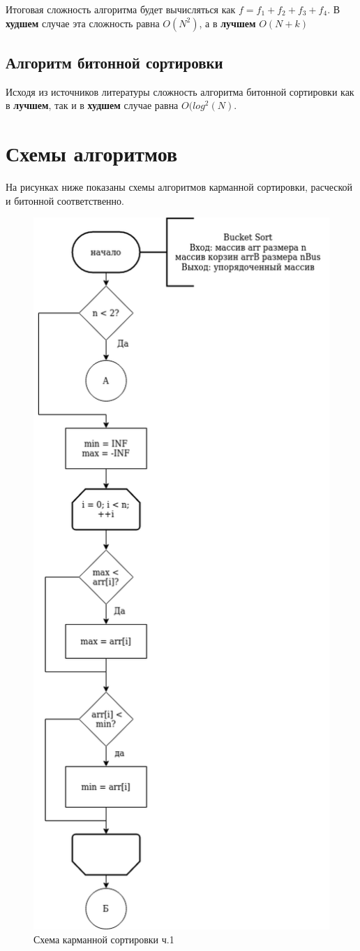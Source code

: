\documentclass[12pt]{report}
\begin{document}
	Итоговая сложность алгоритма будет вычисляться как $f = f_{1} + f_{2} + f_{3} + f_{4}$. В \textbf{худшем} случае эта сложность равна $O(N^2)$, а в \textbf{лучшем} $O(N + k)$
	
	\subsection{Алгоритм битонной сортировки}
	
	Исходя из источников литературы сложность алгоритма битонной сортировки как в \textbf{лучшем}, так и в \textbf{худшем} случае равна $O(log^{2}(N)$.
	
	\section{Схемы алгоритмов}
	
	
	На рисунках ниже показаны схемы алгоритмов карманной сортировки, расческой и битонной соответственно.
	
	\begin{figure}[h]
		\centering
		\includegraphics[width=0.5\linewidth]{bucket_1}
		\caption{Схема карманной сортировки ч.1}
		\label{fig:schema_bucket_1}
	\end{figure}
	
\end{document}
